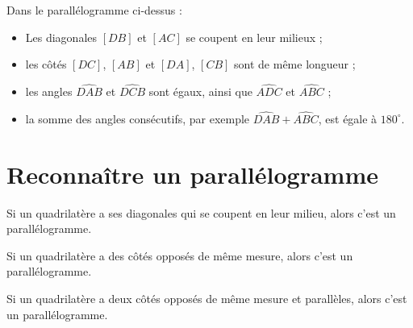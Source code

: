 \documentclass[11pt]{article}
\begin{document}
\begin{remarque}
Dans le parallélogramme ci-dessus :
\begin{itemize}
\item Les diagonales $[DB]$ et $[AC]$ se coupent en leur milieux ;
\item les côtés $[DC]$, $[AB]$ et $[DA]$, $[CB]$ sont de même longueur
;
\item les angles $\widehat{DAB}$ et $\widehat{DCB}$ sont égaux, ainsi que $\widehat{ADC}$ et $\widehat{ABC}$ ;
\item la somme des angles consécutifs, par exemple $\widehat{DAB} + \widehat{ABC}$, est égale à $180^\circ$.
\end{itemize}
\end{remarque}

\section{Reconnaître un parallélogramme}

\begin{propriete}
Si un quadrilatère a ses diagonales qui se coupent en leur milieu, alors c'est un parallélogramme.
\end{propriete}

\begin{propriete}
Si un quadrilatère a des côtés opposés de même mesure, alors c'est un parallélogramme.
\end{propriete}

\begin{propriete}
Si un quadrilatère a deux côtés opposés de même mesure et parallèles, alors c'est un parallélogramme.
\end{propriete}

\begin{exemple}
\begin{center}
\end{center}
\end{exemple}
\end{document}
